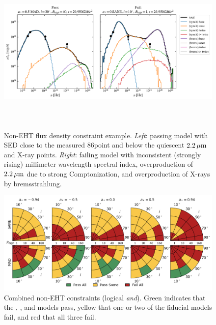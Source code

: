 \begin{figure}[h!]
  \centering
  \includegraphics[height=3.25in]{figures/passfail_sed.pdf}
  \caption{%
    Non-EHT flux density constraint example.
    \emph{Left}: passing model with SED close to the measured 86\GHz point and below the quiescent $2.2\,\mu\mathrm{m}$ and X-ray points.
    \emph{Right}: failing model with inconsistent (strongly rising) millimeter wavelength spectral index, overproduction of $2.2\,\mu\mathrm{m}$ due to strong Comptonization, and overproduction of X-rays by bremsstrahlung.}
  \label{fig:passfail_sed}
\end{figure}

\begin{figure}
  \centering
  \includegraphics[width=\textwidth]{./figures/Non_Interferometric_Constraints.png}
  \caption{Combined non-EHT constraints (logical {\em and}).
    Green indicates that the \kharma, \bhac, and \hamr models pass, yellow that one or two of the fiducial models fail, and red that all three fail.}
  \label{fig:non_eht_cuts}
\end{figure}


